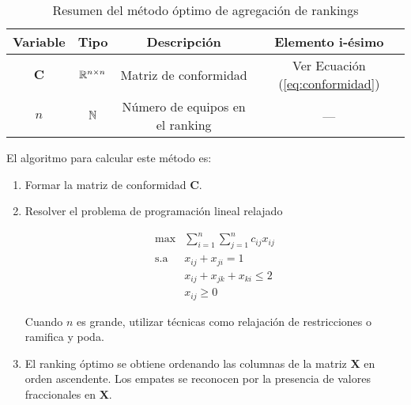 


\begin{table}[h]
	\centering
	\caption{Resumen del método óptimo de agregación de rankings}
	\label{tbl:resumen_optimo}
	\begin{tabular}{@{}cccc@{}}
		\toprule
		Variable     & Tipo              & Descripción                     & Elemento i-ésimo                      \\ \midrule
		$\mathbf{C}$ & $\mathbb{R}^{n \times n}$ & Matriz de conformidad           & Ver Ecuación (\ref{eq:conformidad}) \\ \midrule
		$n$          & $\mathbb{N}$              & Número de equipos en el ranking & ---                                   \\ \bottomrule
	\end{tabular}
\end{table}

El algoritmo para calcular este método es:

\begin{enumerate}
\item Formar la matriz de conformidad $\mathbf{C}$.
\item Resolver el problema de programación lineal relajado

\begin{equation*}
\begin{array}{rl}
\max         & \sum\limits_{i=1}^{n} \sum\limits_{j=1}^{n} c_{ij} x_{ij}\\
\mathrm{s.a} & x_{ij} + x_{ji} = 1\\
             & x_{ij} + x_{jk} + x_{ki} \leq 2\\
             & x_{ij} \geq 0
\end{array}
\end{equation*}

Cuando $n$ es grande, utilizar técnicas como relajación de restricciones o ramifica y poda.

\item El ranking óptimo se obtiene ordenando las columnas de la matriz $\mathbf{X}$ en orden ascendente. Los empates se reconocen por la presencia de valores fraccionales en $\mathbf{X}$.

\end{enumerate}

